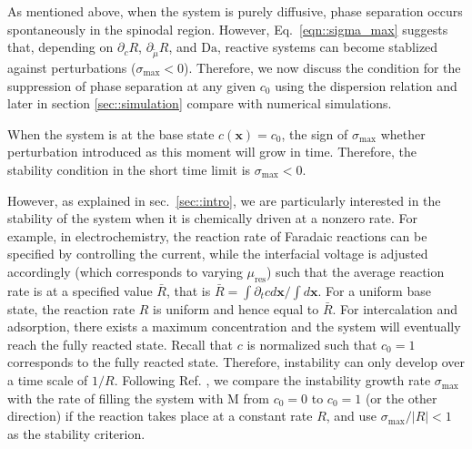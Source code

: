 \documentclass[reprint,aps,pre,superscriptaddress]{revtex4-2}
\begin{document}
As mentioned above, when the system is purely diffusive, phase separation occurs spontaneously in the spinodal region. However, Eq.~\ref{eqn::sigma_max} suggests that, depending on $\partial_c R$, $\partial_{\tilde{\mu}} R$, and $\text{Da}$, reactive systems can become stablized against perturbations ($\sigma_\text{max}<0$). 
Therefore, we now discuss the condition for the suppression of phase separation at any given $c_0$ using the dispersion relation and later in section \ref{sec::simulation} compare with numerical simulations.

When the system is at the base state $c(\mathbf{x})=c_0$, the sign of $\sigma_\text{max}$ whether perturbation introduced as this moment will grow in time. Therefore, the stability condition in the short time limit is $\sigma_\text{max}<0$.

However, as explained in sec.~\ref{sec::intro}, we are particularly interested in the stability of the system when it is chemically driven at a nonzero rate. For example, in electrochemistry, the reaction rate of Faradaic reactions can be specified by controlling the current\cite{Newman2012}, while the interfacial voltage is adjusted accordingly (which corresponds to varying $\mu_\text{res}$) such that the average reaction rate is at a specified value $\bar{R}$, that is $\bar{R} = \int{\partial_t c d\mathbf{x}}/\int{d\mathbf{x}}$.
For a uniform base state, the reaction rate $R$ is uniform and hence equal to $\bar{R}$. For intercalation and adsorption, there exists a maximum concentration and the system will eventually reach the fully reacted state. Recall that $c$ is normalized such that $c_0=1$ corresponds to the fully reacted state. Therefore, instability can only develop over a time scale of $1/R$. 
Following Ref. \cite{Bai2011}, we compare the instability growth rate $\sigma_\text{max}$ with the rate of filling the system with M from $c_0=0$ to $c_0=1$ (or the other direction) if the reaction takes place at a constant rate $R$, and use $\sigma_\text{max}/|R|<1$ as the stability criterion.

\end{document}
